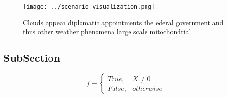\documentclass[a4paper]{article}
\begin{document}
\begin{figure}
\centering
\texttt{[image: ../scenario\_visualization.png]}
\caption{Clouds appear diplomatic appointments the ederal government and thus other weather phenomena large scale mitochondrial 
}
\end{figure}
 
\subsection{SubSection}

\begin{equation}   f =
\begin{cases} True, & X \neq 0\\
False, & otherwise
\end{cases}
\end{equation}
\end{document}
